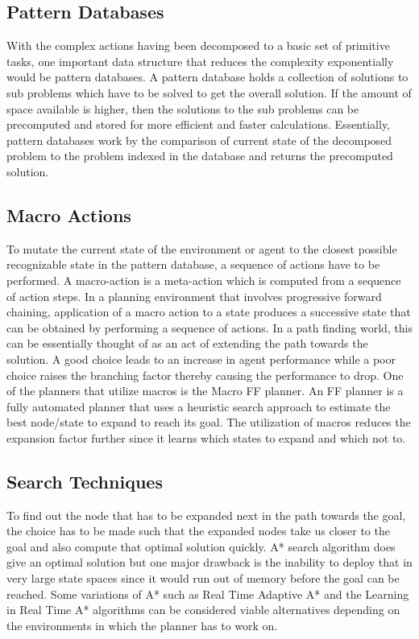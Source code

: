 \documentclass[tog]{acmsiggraph}
\begin{document}
\subsection{Pattern Databases}

With the complex actions having been decomposed to a basic set of
primitive tasks, one important data structure that reduces the
complexity exponentially would be pattern databases. A pattern
database holds a collection of solutions to sub problems which have to
be solved to get the overall solution. If the amount of space
available is higher, then the solutions to the sub problems can be
precomputed and stored for more efficient and faster calculations.
Essentially, pattern databases work by the comparison of current state
of the decomposed problem to the problem indexed in the database and
returns the precomputed solution.

\subsection{Macro Actions}

To mutate the current state of the environment or agent to the closest
possible recognizable state in the pattern database, a sequence of
actions have to be performed. A macro-action is a meta-action which is
computed from a sequence of action steps. In a planning environment
that involves progressive forward chaining, application of a macro
action to a state produces a successive state that can be obtained by
performing a sequence of actions. In a path finding world, this can be
essentially thought of as an act of extending the path towards the
solution. A good choice leads to an increase in agent performance
while a poor choice raises the branching factor thereby causing the
performance to drop. One of the planners that utilize macros is the
Macro FF planner. An FF planner is a fully automated planner that uses
a heuristic search approach to estimate the best node/state to expand
to reach its goal. The utilization of macros reduces the expansion
factor further since it learns which states to expand and which not
to.

\subsection{Search Techniques}


To find out the node that has to be expanded next in the path towards
the goal, the choice has to be made such that the expanded nodes take
us closer to the goal and also compute that optimal solution quickly.
A* search algorithm does give an optimal solution but one major
drawback is the inability to deploy that in very large state spaces
since it would run out of memory before the goal can be reached. Some
variations of A* such as Real Time Adaptive A* and the Learning in
Real Time A* algorithms can be considered viable alternatives
depending on the environments in which the planner has to work on.
\end{document}

